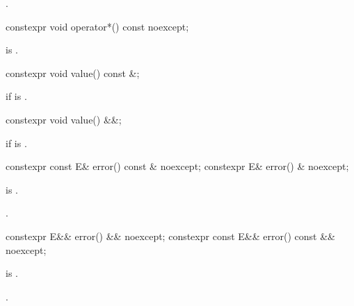 \begin{itemdescr}
\pnum
\returns
{}.
\end{itemdescr}

%
\begin{itemdecl}
constexpr void operator*() const noexcept;
\end{itemdecl}

\begin{itemdescr}
\pnum
\expects
{} is .
\end{itemdescr}

%
\begin{itemdecl}
constexpr void value() const &;
\end{itemdecl}

\begin{itemdescr}
\pnum
\throws
{} if  is .
\end{itemdescr}

%
\begin{itemdecl}
constexpr void value() &&;
\end{itemdecl}

\begin{itemdescr}
\pnum
\throws
{}
if  is .
\end{itemdescr}

%
\begin{itemdecl}
constexpr const E& error() const & noexcept;
constexpr E& error() & noexcept;
\end{itemdecl}

\begin{itemdescr}
\pnum
\expects
{} is .

\pnum
\returns
{}.
\end{itemdescr}

%
\begin{itemdecl}
constexpr E&& error() && noexcept;
constexpr const E&& error() const && noexcept;
\end{itemdecl}

\begin{itemdescr}
\pnum
\expects
{} is .

\pnum
\returns
{}.
\end{itemdescr}

